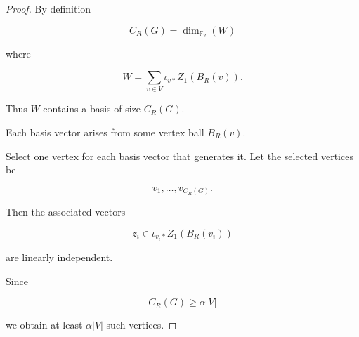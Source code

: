 \documentclass{article}
\begin{document}
\begin{proof}

By definition

\[
C_R(G)=\dim_{\mathbb F_2}(W)
\]

where

\[
W=\sum_{v\in V}\iota_{v*}Z_1(B_R(v)).
\]

Thus $W$ contains a basis of size $C_R(G)$.

Each basis vector arises from some vertex ball
$B_R(v)$.

Select one vertex for each basis vector that generates it.
Let the selected vertices be

\[
v_1,\dots,v_{C_R(G)}.
\]

Then the associated vectors

\[
z_i\in \iota_{v_i*}Z_1(B_R(v_i))
\]

are linearly independent.

Since

\[
C_R(G)\ge\alpha|V|
\]

we obtain at least $\alpha|V|$ such vertices.

\end{proof}
\end{document}
